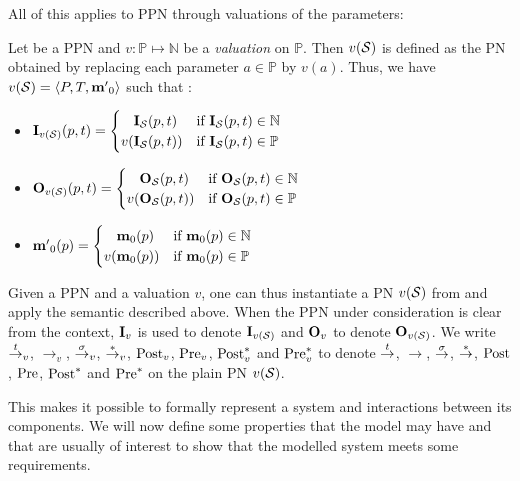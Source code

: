 All of this applies to \ac{PPN} through valuations of the parameters:
\begin{defi}
  Let \SPTPm be a \ac{PPN} and $v : \mathbb{P} \mapsto \mathbb{N}$ be a \emph{valuation} on $\mathbb{P}$.
  Then $v(\mathcal{S})$ is defined as the \ac{PN} obtained by replacing each parameter $a \in \mathbb{P}$ by $v(a)$.
  Thus, we have $v(\mathcal{S}) = \langle P, T, \mathbf{m'}_0\rangle$ such that :
  \begin{itemize}
    \item $\mathbf{I}_{v(\mathcal{S})}(p, t) =
      \begin{cases}
        \phantom{v(}\mathbf{I}_\mathcal{S}(p, t) & \text{if } \mathbf{I}_\mathcal{S}(p, t) \in \mathbb{N} \\
                 v(\mathbf{I}_\mathcal{S}(p, t)) & \text{if } \mathbf{I}_\mathcal{S}(p, t) \in \mathbb{P}
      \end{cases}$
    \item $\mathbf{O}_{v(\mathcal{S})}(p, t) =
      \begin{cases}
        \phantom{v(}\mathbf{O}_\mathcal{S}(p, t) & \text{if } \mathbf{O}_\mathcal{S}(p, t) \in \mathbb{N} \\
                 v(\mathbf{O}_\mathcal{S}(p, t)) & \text{if } \mathbf{O}_\mathcal{S}(p, t) \in \mathbb{P}
      \end{cases}$
    \item $\mathbf{m'}_0(p) =
      \begin{cases}
        \phantom{v(}\mathbf{m}_0(p) & \text{if } \mathbf{m}_0(p) \in \mathbb{N} \\
                 v(\mathbf{m}_0(p)) & \text{if } \mathbf{m}_0(p) \in \mathbb{P}
      \end{cases}$
  \end{itemize}
\end{defi}

Given \tupleS a \ac{PPN} and a valuation $v$, one can thus instantiate a \ac{PN} $v(\mathcal{S})$ from \tupleS and apply the semantic described above.  When the \ac{PPN} under consideration is clear from the context, $\mathbf{I}_v$ is used to denote $\mathbf{I}_{v(\mathcal{S})}$ and $\mathbf{O}_v$ to denote $\mathbf{O}_{v(\mathcal{S})}$. We write $\stackrel{t}{\to}_v$, $\rightarrow_v$, $\stackrel{\sigma}{\to}_v$, $\stackrel{*}{\to}_v$, $\operatorname{Post}_v$, $\operatorname{Pre}_v$, $\operatorname{Post}^*_v$ and $\operatorname{Pre}^*_v$ to denote $\stackrel{t}{\to}$, $\rightarrow$, $\stackrel{\sigma}{\to}$, $\stackrel{*}{\to}$, $\operatorname{Post}$, $\operatorname{Pre}$, $\operatorname{Post}^*$ and $\operatorname{Pre}^*$ on the plain \ac{PN} $v(\mathcal{S})$.

This makes it possible to formally represent a system and interactions between its components. We will now define some properties that the model may have and that are usually of interest to show that the modelled system meets some requirements.

